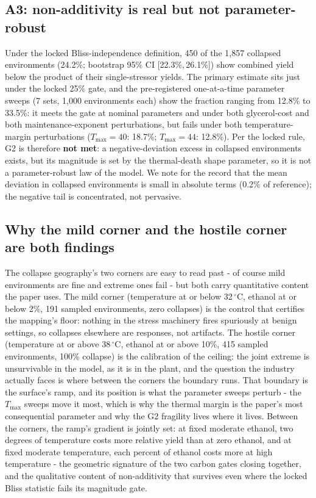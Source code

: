 \documentclass[12pt]{article}
\begin{document}
\subsection{A3: non-additivity is real but not parameter-robust}
\label{sec:a3}

Under the locked Bliss-independence definition, 450 of the 1{,}857
collapsed environments (24.2\%; bootstrap 95\% CI
[22.3\%,\,26.1\%]) show combined yield below the product of their
single-stressor yields. The primary estimate sits just under the
locked 25\% gate, and the pre-registered one-at-a-time parameter
sweeps (7 sets, 1{,}000 environments each) show the fraction ranging
from 12.8\% to 33.5\%: it meets the gate at nominal parameters and
under both glycerol-cost and both maintenance-exponent perturbations,
but fails under both temperature-margin perturbations
($T_{\max}=40$: 18.7\%; $T_{\max}=44$: 12.8\%). Per the locked
rule, G2 is therefore \textbf{not met}: a negative-deviation excess
in collapsed environments exists, but its magnitude is set by the
thermal-death shape parameter, so it is not a parameter-robust law
of the model. We note for the record that the mean deviation in
collapsed environments is small in absolute terms (0.2\% of
reference); the negative tail is concentrated, not pervasive.



\subsection{Why the mild corner and the hostile corner are both findings}

The collapse geography's two corners are easy to read past - of
course mild environments are fine and extreme ones fail - but both
carry quantitative content the paper uses. The mild corner
(temperature at or below 32\,$^{\circ}$C, ethanol at or below 2\%,
191 sampled environments, zero collapses) is the control that
certifies the mapping's floor: nothing in the stress machinery fires
spuriously at benign settings, so collapses elsewhere are responses,
not artifacts. The hostile corner (temperature at or above
38\,$^{\circ}$C, ethanol at or above 10\%, 415 sampled environments,
100\% collapse) is the calibration of the ceiling: the joint extreme
is unsurvivable in the model, as it is in the plant, and the
question the industry actually faces is where between the corners
the boundary runs. That boundary is the surface's ramp, and its
position is what the parameter sweeps perturb - the $T_{\max}$ sweeps
move it most, which is why the thermal margin is the paper's most
consequential parameter and why the G2 fragility lives where it
lives. Between the corners, the ramp's gradient is jointly set: at
fixed moderate ethanol, two degrees of temperature costs more
relative yield than at zero ethanol, and at fixed moderate
temperature, each percent of ethanol costs more at high temperature
- the geometric signature of the two carbon gates closing together,
and the qualitative content of non-additivity that survives even
where the locked Bliss statistic fails its magnitude gate.
\end{document}
